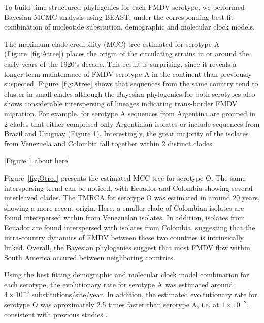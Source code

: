 \documentclass[10pt]{article}
\begin{document}
To build time-structured phylogenies for each FMDV serotype, we performed Bayesian MCMC analysis using BEAST, under the corresponding best-fit combination of nucleotide subsitution, demographic and molecular clock models.

The maximum clade credibility (MCC) tree estimated for serotype A (Figure~\ref{fig:Atree}) 
places the origin of the circulating strains in or around the early years of the 1920's decade.
This result is surprising, since it reveals a longer-term maintenance of FMDV serotype A in the continent than previously suspected.
Figure~\ref{fig:Atree} shows that sequences from the same country tend to cluster in small clades although the Bayesian phylogenies for both serotypes also shows considerable interspersing of lineages indicating trans-border FMDV migration. For example, for serotype A sequences from Argentina are grouped in 2 clades that either comprised only Argentinian isolates or include sequences from Brazil and Uruguay (Figure 1). Interestingly, the great majority of the isolates from Venezuela and Colombia fall together within 2 distinct clades. 

\begin{center}
 [Figure 1 about here]
\end{center}

Figure~\ref{fig:Otree} presents the estimated MCC tree for serotype O. The same interspersing trend can be noticed, with Ecuador and Colombia showing several interleaved clades. The TMRCA for serotype O was estimated in around 20 years, showing a more recent origin. Here, a smaller clade of Colombian isolates are found interspersed within from Venezuelan isolates. In addition, isolates from Ecuador are found interspersed with isolates from Colombia, suggesting that the intra-country dynamics of FMDV between these two countries is intrinsically linked. Overall, the Bayesian phylogenies suggest that most FMDV flow within South America occured between neighboring countries. 

Using the best fitting demographic and molecular clock model combination for each serotype, the evolutionary rate for serotype A was estimated around $4 \times 10^{-3}$ substitutions/site/year. In addition, the estimated evoltutionary rate for serotype O was aproximately 2.5 times faster than serotype A, i.e. at $1 \times 10^{-2}$, consistent with previous studies \cite{review,Carvalho2012}. 
\end{document}
